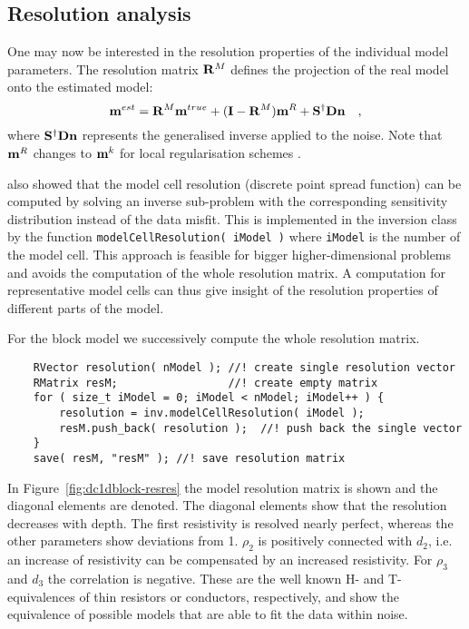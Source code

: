 \subsection{Resolution analysis}\label{sec:dc1dresolution}
One may now be interested in the resolution properties of the individual model parameters.
The resolution matrix ${\bf R}^M$ defines the projection of the real model onto the estimated model:
\begin{equation}
	\mathbf{m}^{est} = {\bf R}^M \mathbf{m}^{true} + (\mathbf{I} - {\bf R}^M) \mathbf{m}^R + \mathbf{S}^\dagger\mathbf{D}\mathbf{n}\quad,
\end{equation}
\citep{guentherdiss} where $\mathbf{S}^\dagger\mathbf{D}\mathbf{n}$ represents the generalised inverse applied to the noise.
Note that $\mathbf{m}^R$ changes to $\mathbf{m}^k$ for local regularisation schemes \citep{friedel03}.

\citet{guentherdiss} also showed that the model cell resolution (discrete point spread function) can be computed by solving an inverse sub-problem with the corresponding sensitivity distribution instead of the data misfit.
This is implemented in the inversion class by the function \lstinline|modelCellResolution( iModel )| where \lstinline|iModel| is the number of the model cell.
This approach is feasible for bigger higher-dimensional problems and avoids the computation of the whole resolution matrix.
A computation for representative model cells can thus give insight of the resolution properties of different parts of the model.

For the block model we successively compute the whole resolution matrix.
\begin{lstlisting}
    RVector resolution( nModel ); //! create single resolution vector
    RMatrix resM;                 //! create empty matrix 
    for ( size_t iModel = 0; iModel < nModel; iModel++ ) {
        resolution = inv.modelCellResolution( iModel );
        resM.push_back( resolution );  //! push back the single vector
    }
    save( resM, "resM" ); //! save resolution matrix
\end{lstlisting}

In Figure~\ref{fig:dc1dblock-resres} the model resolution matrix is shown and the diagonal elements are denoted.
The diagonal elements show that the resolution decreases with depth.
The first resistivity is resolved nearly perfect, whereas the other parameters show deviations from 1.
$\rho_2$ is positively connected with $d_2$, i.e. an increase of resistivity can be compensated by an increased resistivity.
For $\rho_3$ and $d_3$ the correlation is negative.
These are the well known H- and T-equivalences of thin resistors or conductors, respectively, and show the equivalence of possible models that are able to fit the data within noise.


